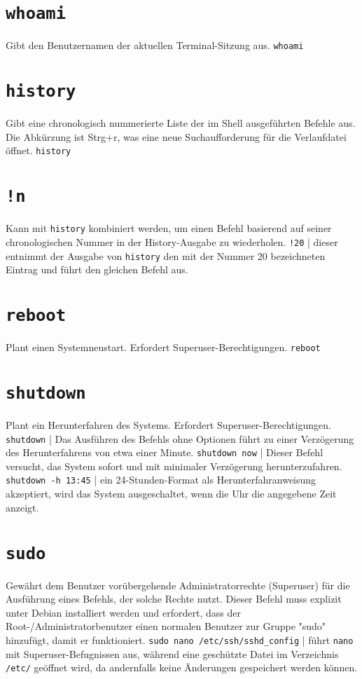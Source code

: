 \documentclass{article}
\newcommand{\doublebreak}{\break\break}
\begin{document}
	\newpage
	
	\section{\texttt{whoami}}
	Gibt den Benutzernamen der aktuellen Terminal-Sitzung aus.
	\doublebreak
	\texttt{whoami}
	
	\section{\texttt{history}}
	Gibt eine chronologisch nummerierte Liste der im Shell ausgeführten Befehle aus. Die Abkürzung ist Strg+r, was eine neue Suchaufforderung für die Verlaufdatei öffnet.
	\doublebreak
	\texttt{history}
	
	\section{\texttt{!n}}
	Kann mit \texttt{history} kombiniert werden, um einen Befehl basierend auf seiner chronologischen Nummer in der History-Ausgabe zu wiederholen.
	\doublebreak
	\texttt{!20} | dieser entnimmt der Ausgabe von \texttt{history} den mit der Nummer 20 bezeichneten Eintrag und führt den gleichen Befehl aus.
	
	\section{\texttt{reboot}}
	Plant einen Systemneustart. Erfordert Superuser-Berechtigungen.
	\doublebreak
	\texttt{reboot}
	
	\section{\texttt{shutdown}}
	Plant ein Herunterfahren des Systems. Erfordert Superuser-Berechtigungen.
	\doublebreak
	\texttt{shutdown} | Das Ausführen des Befehls ohne Optionen führt zu einer Verzögerung des Herunterfahrens von etwa einer Minute.
	\doublebreak
	\texttt{shutdown now} | Dieser Befehl versucht, das System sofort und mit minimaler Verzögerung herunterzufahren.
	\doublebreak
	\texttt{shutdown -h 13:45} | ein 24-Stunden-Format als Herunterfahranweisung akzeptiert, wird das System ausgeschaltet, wenn die Uhr die angegebene Zeit anzeigt.
	
	\newpage
	
	\section{\texttt{sudo}}
	Gewährt dem Benutzer vorübergehende Administratorrechte (Superuser) für die Ausführung eines Befehls, der solche Rechte nutzt. Dieser Befehl muss explizit unter Debian installiert werden und erfordert, dass der Root-/Administratorbenutzer einen normalen Benutzer zur Gruppe "sudo" hinzufügt, damit er funktioniert.
	\doublebreak
	\texttt{sudo nano /etc/ssh/sshd\_config} | führt \texttt{nano} mit Superuser-Befugnissen aus, während eine geschützte Datei im Verzeichnis \texttt{{/etc/}} geöffnet wird, da andernfalls keine Änderungen gespeichert werden können.
	
\end{document}
